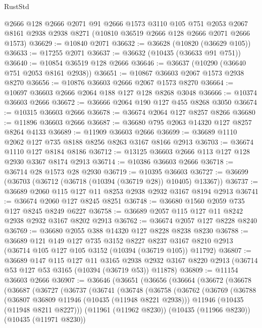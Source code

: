 \begin{lexlean}{RustStd}
\begin{coremodule}
    @2666
    @128
    @2666
    @2071
    @91
    @2666
    @1573
    @3110
    @105
    @751
    @2053
    @2067
    @8161
    @2938
    @2938
    @8271
    (@10810 @36519 @2666 @128 @2666 @2071 @2666 @1573)
@36629 := @10840 @2071
@36632 := @36628 (@10820 (@36629 @105))
@36633 := @17255 @2071
@36637 := @36632 (@10435 (@36633 @91 @751))
@36640 := @10854 @36519 @128 @2666
@36646 := @36637 (@10290 (@36640 @751 @2053 @8161 @2938))
@36651 := @10867 @36603 @2067 @1573 @2938 @8270
@36656 := @10876 @36603 @2666 @2067 @1573 @8270
@36664 := @10697 @36603 @2666 @2064 @188 @127 @128 @8268 @3048
@36666 := @10374 @36603 @2666
@36672 := @36666 @2064 @190 @127 @455 @8268 @3050
@36674 := @10315 @36603 @2666
@36678 := @36674 @2064 @127 @8257 @8266
@36680 := @11896 @36603 @2666
@36687 := @36680 @795 @2063 @14320 @127 @8257 @8264 @4133
@36689 := @11909 @36603 @2666
@36699 := @36689 @1110 @2062 @127 @735 @8188 @8256 @8263 @3167 @8166 @2913
@36703 := @36674 @1110 @127 @8184 @8186
@36712 := @13125 @36603 @2666 @113 @127 @128 @2930 @3367 @8174 @2913
@36714 := @10386 @36603 @2666
@36718 := @36714 @28 @1573 @28 @2930
@36719 := @10395 @36603
@36727 := @36699 (@36703 (@36712 (@36718 (@10394 (@36719 @28)) @10405) @13367))
@36737 := @36689 @2060 @115 @127 @11 @8253 @2938 @2932 @3167 @8194 @2913
@36741 := @36674 @2060 @127 @8245 @8251
@36748 := @36680 @1560 @2059 @735 @127 @8245 @8249 @6227
@36758 := @36689 @2057 @115 @127 @11 @8242 @2938 @2932 @3167 @8202 @2913
@36762 := @36674 @2057 @127 @8228 @8240
@36769 := @36680 @2055 @388 @14320 @127 @8228 @8238 @8230
@36788 := @36689
    @121
    @149
    @127
    @735
    @3152
    @8227
    @8237
    @3167
    @8210
    @2913
    (@36714 @105 @127 @105 @3152 (@10394 (@36719 @105)) @11792)
@36807 := @36689
    @147
    @115
    @127
    @11
    @3165
    @2938
    @2932
    @3167
    @8220
    @2913
    (@36714 @53 @127 @53 @3165 (@10394 (@36719 @53)) @11878)
@36809 := @11154 @36603 @2666
@36907 := @36646
    (@36651
      (@36656
        (@36664
          (@36672
            (@36678
              (@36687
                (@36727
                  (@36737
                    (@36741
                      (@36748
                        (@36758
                          (@36762
                            (@36769
                              (@36788
                                (@36807 @36809 @11946 (@10435 (@11948 @8221 @2938)))
                                @11946
                                (@10435 (@11948 @8211 @8227)))
                              (@11961 (@11962 @8230))
                              (@10435 (@11966 @8230))
                              (@10435 (@11971 @8230))

\end{coremodule}
\end{lexlean}
